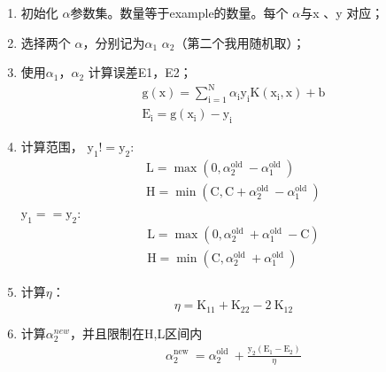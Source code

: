 \documentclass[UTF8,a4paper,AutoFakeBold,AutoFakeSlant]{article}
\begin{document}
\begin{enumerate}
  \item 初始化 $\alpha$参数集。数量等于example的数量。每个 $\alpha$与x 、y 对应；
  \item 选择两个 $\alpha$，分别记为$\alpha_1$ $\alpha_2$（第二个我用随机取）；
  \item 使用$\alpha_1$，$\alpha_2$ 计算误差E1，E2；
  \begin{equation*}
    \begin{array}{c}
      \mathrm{g}(\mathrm{x})=\sum_{\mathrm{i}=1}^{\mathrm{N}} \alpha_{\mathrm{i}} \mathrm{y}_{\mathrm{i}} \mathrm{K}\left(\mathrm{x}_{\mathrm{i}}, \mathrm{x}\right)+\mathrm{b} \\
      \mathrm{E}_{\mathrm{i}}=\mathrm{g}\left(\mathrm{x}_{\mathrm{i}}\right)-\mathrm{y}_{\mathrm{i}}
      \end{array}
  \end{equation*}
  \item 计算范围，
  $\mathrm{y}_{1} !=\mathrm{y}_{2}$:
  \begin{equation*}
    \begin{array}{c}
      \mathrm{L}=\max \left(0, \alpha_{2}^{\text {old }}-\alpha_{1}^{\text {old }}\right) \\
      \mathrm{H}=\min \left(\mathrm{C}, \mathrm{C}+\alpha_{2}^{\text {old }}-\alpha_{1}^{\text {old }}\right)
      \end{array}
  \end{equation*}
  $\mathrm{y}_{1} ==\mathrm{y}_{2}$:
  \begin{equation*}
    \begin{array}{c}
      \mathrm{L}=\max \left(0, \alpha_{2}^{\text {old }}+\alpha_{1}^{\text {old }}-\mathrm{C}\right) \\
      \mathrm{H}=\min \left(\mathrm{C}, \alpha_{2}^{\text {old }}+\alpha_{1}^{\text {old }}\right)
      \end{array}
  \end{equation*}
  \item 计算$\eta$：
  \begin{equation*}
    \eta=\mathrm{K}_{11}+\mathrm{K}_{22}-2 \mathrm{~K}_{12}
  \end{equation*}
  \item 计算$\alpha_2^{new}$，并且限制在H,L区间内
  \begin{equation*}
    \begin{array}{c}
      \alpha_{2}^{\text {new }}=\alpha_{2}^{\text {old }}+\frac{\mathrm{y}_{2}\left(\mathrm{E}_{1}-\mathrm{E}_{2}\right)}{\eta} \\

\end{array}
\end{equation*}
\end{enumerate}
\end{document}
